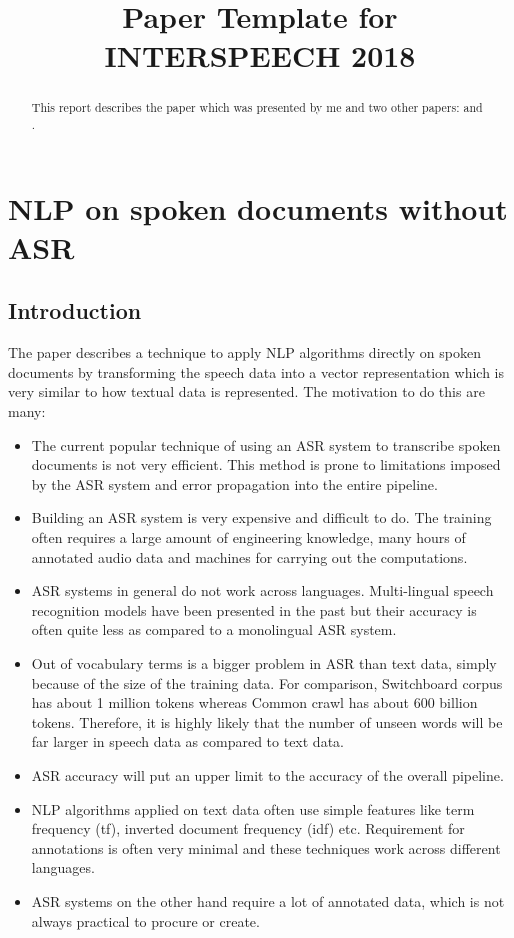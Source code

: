 \documentclass[a4paper]{article}
\title{Paper Template for INTERSPEECH 2018}
\begin{document}
\maketitle
%
\begin{abstract}
  This report describes the paper \cite{dredze2010nlp} which was presented by me and two other papers: \cite{li2018spoken} and \cite{rosiger2017improving}.
\end{abstract}

\section{NLP on spoken documents without ASR}
\subsection{Introduction}
The paper \cite{dredze2010nlp} describes a technique to apply NLP algorithms directly on spoken documents by transforming the speech data into a vector representation which is very similar to how textual data is represented. The motivation to do this are many:

\begin{itemize}
\item The current popular technique of using an ASR system to transcribe spoken documents is not very efficient. This method is prone to limitations imposed by the ASR system and error propagation into the entire pipeline.
\item Building an ASR system is very expensive and difficult to do. The training often requires a large amount of engineering knowledge, many hours of annotated audio data and machines for carrying out the computations.
\item ASR systems in general do not work across languages. Multi-lingual speech recognition models have been presented in the past but their accuracy is often quite less as compared to a monolingual ASR system.
\item Out of vocabulary terms is a bigger problem in ASR than text data, simply because of the size of the training data. For comparison, Switchboard corpus has about 1 million tokens whereas Common crawl has about 600 billion tokens. Therefore, it is highly likely that the number of unseen words will be far larger in speech data as compared to text data.
\item ASR accuracy will put an upper limit to the accuracy of the overall pipeline.
\item NLP algorithms applied on text data often use simple features like term frequency (tf), inverted document frequency (idf) etc. Requirement for annotations is often very minimal and these techniques work across different languages.
\item ASR systems on the other hand require a lot of annotated data, which is not always practical to procure or create.
\end{itemize}
\end{document}
